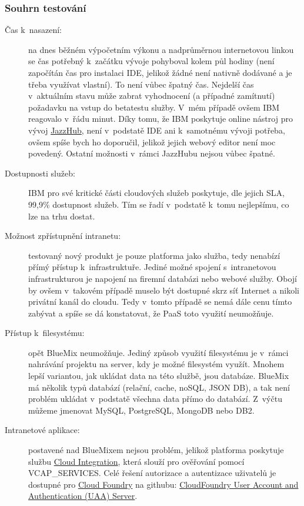 \subsubsection{Souhrn testování}
\begin{description}
	\item [Čas k~nasazení:] na dnes běžném výpočetním výkonu a nadprůměrnou internetovou linkou se čas potřebný k~začátku vývoje pohyboval kolem půl hodiny (není započítán čas pro instalaci IDE, jelikož žádné není nativně dodávané a je třeba využívat vlastní). To není vůbec špatný čas. Nejdelší čas v~aktuálním stavu může zabrat vyhodnocení (a případné zamítnutí) požadavku na vstup do betatestu služby. V~mém případě ovšem IBM reagovalo v~řádu minut. Díky tomu, že IBM poskytuje online nástroj pro vývoj \href{https://hub.jazz.net}{JazzHub}, není v~podstatě IDE ani k~samotnému vývoji potřeba, ovšem spíše bych ho doporučil, jelikož jejich webový editor není moc povedený. Ostatní možnosti v~rámci JazzHubu nejsou vůbec špatné.
	\item [Dostupnosti služeb:] IBM pro své kritické části cloudových služeb poskytuje, dle jejich SLA, 99,9\% dostupnost služeb. Tím se řadí v~podstatě k~tomu nejlepšímu, co lze na trhu dostat.
	\item [Možnost zpřístupnění intranetu:] testovaný nový produkt je pouze platforma jako služba, tedy nenabízí přímý přístup k~infrastruktuře. Jediné možné spojení s~intranetovou infrastrukturou je napojení na firemní databázi nebo webové služby. Obojí by ovšem v~takovém případě muselo být dostupné skrz síť Internet a nikoli privátní kanál do cloudu. Tedy v~tomto případě se nemá dále cenu tímto zabývat a spíše se dá konstatovat, že PaaS toto využití neumožňuje.
	\item [Přístup k~filesystému:] opět BlueMix neumožňuje. Jediný způsob využití filesystému je v~rámci nahrávání projektu na server, kdy je možné filesystém využít. Mnohem lepší variantou, jak ukládat data na této službě, jsou databáze. BlueMix má několik typů databází (relační, cache, noSQL, JSON DB), a tak není problém ukládat v~podstatě všechna data přímo do databází. Z~výčtu můžeme jmenovat MySQL, PostgreSQL, MongoDB nebo DB2.
	\item [Intranetové aplikace:] postavené nad BlueMixem nejsou problém, jelikož platforma poskytuje službu \href{http://www.ng.bluemix.net/docs/Services/CloudIntegration/CloudIntegration.html}{Cloud Integration}, která slouží pro ověřování pomocí VCAP\_SERVICES. Celé řešení autorizace a autentizace uživatelů je dostupné pro \href{http://www.cloudfoundry.org}{Cloud Foundry} na githubu: \href{https://github.com/cloudfoundry/uaa}{CloudFoundry User Account and Authentication (UAA) Server}.

\end{description}

